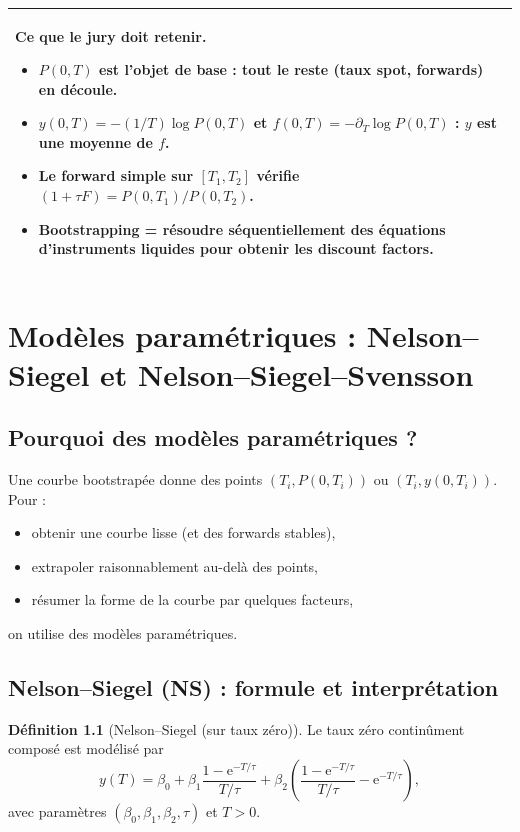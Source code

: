 \documentclass[11pt,a4paper]{report}
\newcommand{\ee}{\mathrm{e}}
\newcommand{\1}{\mathbbm{1}}
\theoremstyle{definition}
\newtheorem{definition}{Définition}[chapter]
\theoremstyle{plain}
\theoremstyle{remark}
\newenvironment{jurybox}{%
  \begin{center}
  \setlength{\tabcolsep}{6pt}%
  \renewcommand{\arraystretch}{1.1}%
  \begin{tabular}{|p{0.94\textwidth}|}
  \hline
  \small\textbf{Ce que le jury doit retenir.}\par\medskip
}{%
  \\ \hline
  \end{tabular}
  \end{center}
}
\begin{document}
\begin{jurybox}
\begin{itemize}
\item $P(0,T)$ est l'objet de base : tout le reste (taux spot, forwards) en découle.
\item $y(0,T)=-(1/T)\log P(0,T)$ et $f(0,T)=-\partial_T\log P(0,T)$ : $y$ est une moyenne de $f$.
\item Le forward simple sur $[T_1,T_2]$ vérifie $(1+\tau F)=P(0,T_1)/P(0,T_2)$.
\item Bootstrapping = résoudre séquentiellement des équations d'instruments liquides pour obtenir les discount factors.
\end{itemize}
\end{jurybox}

\chapter{Modèles paramétriques : Nelson--Siegel et Nelson--Siegel--Svensson}
\label{chap:ns_nss}

\section{Pourquoi des modèles paramétriques ?}
Une courbe bootstrapée donne des points $(T_i,P(0,T_i))$ ou $(T_i,y(0,T_i))$.
Pour :
\begin{itemize}
  \item obtenir une courbe lisse (et des forwards stables),
  \item extrapoler raisonnablement au-delà des points,
  \item résumer la forme de la courbe par quelques facteurs,
\end{itemize}
on utilise des modèles paramétriques.

\section{Nelson--Siegel (NS) : formule et interprétation}
\begin{definition}[Nelson--Siegel (sur taux zéro)]
Le taux zéro continûment composé est modélisé par
\[
y(T)=\beta_0 + \beta_1 \frac{1-\ee^{-T/\tau}}{T/\tau}
+ \beta_2\left(\frac{1-\ee^{-T/\tau}}{T/\tau}-\ee^{-T/\tau}\right),
\]
avec paramètres $(\beta_0,\beta_1,\beta_2,\tau)$ et $T>0$.
\end{definition}
\end{document}
